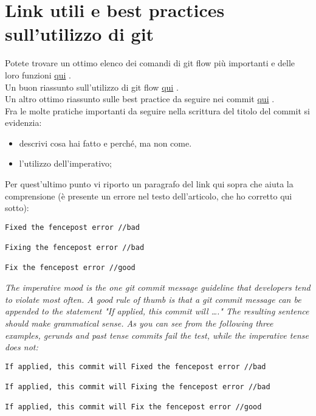 \section{Link utili e best practices sull'utilizzo di git}
Potete trovare un ottimo elenco dei comandi di git flow più importanti e delle loro funzioni
\href{https://danielkummer.github.io/git-flow-cheatsheet/}{qui} \cite{GitFlowCheatseet}. \\
Un buon riassunto sull'utilizzo di git flow \href{https://www.atlassian.com/git/tutorials/comparing-workflows/gitflow-workflow}{qui} \cite{GitFlowWorkflowTutorial}.\\
Un altro ottimo riassunto sulle best practice da seguire nei commit \href{https://www.theserverside.com/video/Follow-these-git-commit-message-guidelines}{qui} \cite{GitCommitGuidelines}. \\
Fra le molte pratiche importanti da seguire nella scrittura del titolo del commit si evidenzia:
\begin{itemize}
\item descrivi cosa hai fatto e perch\'{e}, ma non come.
\item l'utilizzo dell'imperativo;
\end{itemize}
Per quest'ultimo punto vi riporto un paragrafo del link qui sopra che aiuta la comprensione (è presente un errore nel testo dell'articolo, che ho corretto qui sotto):
\begin{lstlisting}
Fixed the fencepost error //bad

Fixing the fencepost error //bad

Fix the fencepost error //good
\end{lstlisting}
\textit{The imperative mood is the one git commit message guideline that developers tend to violate most often. A good rule of thumb is that a git commit message can be appended to the statement "If applied, this commit will …." The resulting sentence should make grammatical sense. As you can see from the following three examples, gerunds and past tense commits fail the test, while the imperative tense does not:}
\begin{lstlisting}
If applied, this commit will Fixed the fencepost error //bad

If applied, this commit will Fixing the fencepost error //bad

If applied, this commit will Fix the fencepost error //good
\end{lstlisting}
